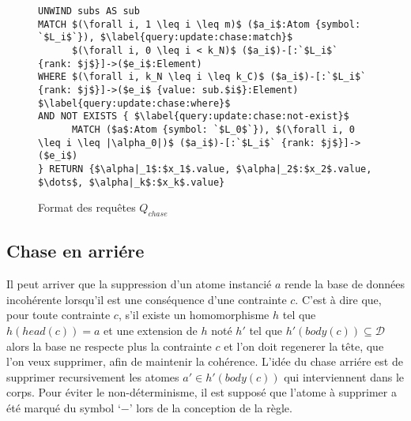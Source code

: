 \begin{figure}[ht]
	\begin{lstlisting}[mathescape]
UNWIND subs AS sub
MATCH $(\forall i, 1 \leq i \leq m)$ ($a_i$:Atom {symbol: `$L_i$`}), $\label{query:update:chase:match}$
      $(\forall i, 0 \leq i < k_N)$ ($a_i$)-[:`$L_i$` {rank: $j$}]->($e_i$:Element)
WHERE $(\forall i, k_N \leq i \leq k_C)$ ($a_i$)-[:`$L_i$` {rank: $j$}]->($e_i$ {value: sub.$i$}:Element) $\label{query:update:chase:where}$
AND NOT EXISTS { $\label{query:update:chase:not-exist}$
      MATCH ($a$:Atom {symbol: `$L_0$`}), $(\forall i, 0 \leq i \leq |\alpha_0|)$ ($a_i$)-[:`$L_i$` {rank: $j$}]->($e_i$)
} RETURN {$\alpha|_1$:$x_1$.value, $\alpha|_2$:$x_2$.value, $\dots$, $\alpha|_k$:$x_k$.value}
	\end{lstlisting}
	\caption{Format des requêtes $Q_{chase}$}
    \label{algo:update:chase:query}
\end{figure}

\begin{example}
    \label{ex:update:chase:query}

\end{example}

\subsection{Chase en arriére}
Il peut arriver que la suppression d'un atome instancié $a$ rende la base de données incohérente lorsqu'il est une conséquence d'une contrainte $c$.
C'est à dire que, pour toute contrainte $c$, s'il existe un homomorphisme $h$ tel que $h(head(c)) = a$ et une extension de $h$ noté $h'$ tel que $h'(body(c)) \subseteq \mathcal{D}$ alors la base ne respecte plus la contrainte $c$ et l'on doit regenerer la tête, que l'on veux supprimer, afin de maintenir la cohérence.
L'idée du chase arriére est de supprimer recursivement les atomes $a' \in h'(body(c))$ qui interviennent dans le corps.
Pour éviter le non-déterminisme, il est supposé que l'atome à supprimer a été marqué du symbol `$-$' lors de la conception de la règle.

